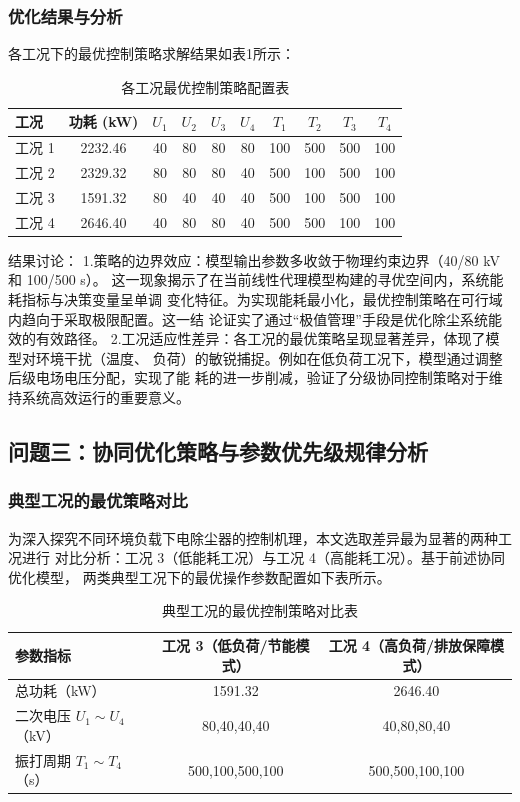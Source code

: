 \documentclass[UTF8, a4paper]{ctexart}
\begin{document}
\subsubsection{优化结果与分析}
各工况下的最优控制策略求解结果如表1所示：
\begin{table}[htbp]
    \centering
    \caption{各工况最优控制策略配置表}
    \label{tab:1}
    \begin{tabular}{lccccccccc}
        \toprule
        工况 & 功耗 (kW) & $U_1$ & $U_2$ & $U_3$ & $U_4$ & $T_1$ & $T_2$ & $T_3$ & $T_4$ \\
        \midrule
        工况 1 & 2232.46 & 40 & 80 & 80 & 80 & 100 & 500 & 500 & 100 \\
        工况 2 & 2329.32 & 80 & 80 & 80 & 40 & 500 & 100 & 500 & 100 \\
        工况 3 & 1591.32 & 80 & 40 & 40 & 40 & 500 & 100 & 500 & 100 \\
        工况 4 & 2646.40 & 40 & 80 & 80 & 40 & 500 & 500 & 100 & 100 \\
        \bottomrule
    \end{tabular}
\end{table}

结果讨论：
1.策略的边界效应：模型输出参数多收敛于物理约束边界（40/80 kV 和 100/500 s）。
这一现象揭示了在当前线性代理模型构建的寻优空间内，系统能耗指标与决策变量呈单调
变化特征。为实现能耗最小化，最优控制策略在可行域内趋向于采取极限配置。这一结
论证实了通过“极值管理”手段是优化除尘系统能效的有效路径。
2.工况适应性差异：各工况的最优策略呈现显著差异，体现了模型对环境干扰（温度、
负荷）的敏锐捕捉。例如在低负荷工况下，模型通过调整后级电场电压分配，实现了能
耗的进一步削减，验证了分级协同控制策略对于维持系统高效运行的重要意义。

\subsection{问题三：协同优化策略与参数优先级规律分析}
\subsubsection{典型工况的最优策略对比}

为深入探究不同环境负载下电除尘器的控制机理，本文选取差异最为显著的两种工况进行
对比分析：工况 3（低能耗工况）与工况 4（高能耗工况）。基于前述协同优化模型，
两类典型工况下的最优操作参数配置如下表所示。
\begin{table}[htbp]
    \centering
    \caption{典型工况的最优控制策略对比表}
    \label{tab:2}
    \begin{tabular}{lcc}
        \toprule
        参数指标 & 工况 3（低负荷/节能模式） & 工况 4（高负荷/排放保障模式） \\
        \midrule
        总功耗（kW） & 1591.32 & 2646.40 \\
        二次电压 $U_1 \sim U_4$（kV） & 80,40,40,40 & 40,80,80,40 \\
        振打周期 $T_1 \sim T_4$（s） & 500,100,500,100 & 500,500,100,100 \\
        \bottomrule
    \end{tabular}
\end{table}
\end{document}
